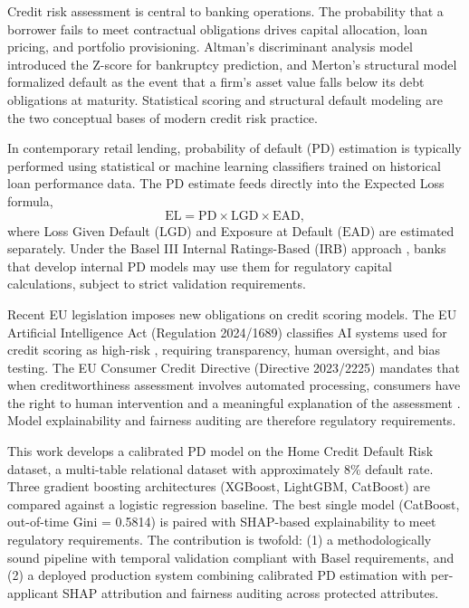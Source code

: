 \documentclass[11pt, a4paper]{article}
\newcommand{\PD}{\text{PD}}
\newcommand{\LGD}{\text{LGD}}
\newcommand{\EAD}{\text{EAD}}
\newcommand{\EL}{\text{EL}}
\begin{document}
Credit risk assessment is central to banking operations. The probability that a borrower fails to meet contractual obligations drives capital allocation, loan pricing, and portfolio provisioning. Altman's \citeyear{altman1968} discriminant analysis model introduced the Z-score for bankruptcy prediction, and Merton's \citeyear{merton1974} structural model formalized default as the event that a firm's asset value falls below its debt obligations at maturity. Statistical scoring and structural default modeling are the two conceptual bases of modern credit risk practice.

In contemporary retail lending, probability of default (PD) estimation is typically performed using statistical or machine learning classifiers trained on historical loan performance data. The PD estimate feeds directly into the Expected Loss formula,
\begin{equation}
\label{eq:expected_loss}
\EL = \PD \times \LGD \times \EAD,
\end{equation}
where Loss Given Default ($\LGD$) and Exposure at Default ($\EAD$) are estimated separately. Under the Basel III Internal Ratings-Based (IRB) approach \parencite{bcbs_basel_framework_2024}, banks that develop internal PD models may use them for regulatory capital calculations, subject to strict validation requirements.

Recent EU legislation imposes new obligations on credit scoring models. The EU Artificial Intelligence Act (Regulation 2024/1689) classifies AI systems used for credit scoring as high-risk \parencite{eu_ai_act_2024_1689}, requiring transparency, human oversight, and bias testing. The EU Consumer Credit Directive (Directive 2023/2225) mandates that when creditworthiness assessment involves automated processing, consumers have the right to human intervention and a meaningful explanation of the assessment \parencite{eu_consumer_credit_directive_2023}. Model explainability and fairness auditing are therefore regulatory requirements.

This work develops a calibrated PD model on the Home Credit Default Risk dataset, a multi-table relational dataset with approximately 8\% default rate. Three gradient boosting architectures (XGBoost, LightGBM, CatBoost) are compared against a logistic regression baseline. The best single model (CatBoost, out-of-time Gini = 0.5814) is paired with SHAP-based explainability \parencite{lundberg2017} to meet regulatory requirements. The contribution is twofold: (1) a methodologically sound pipeline with temporal validation compliant with Basel requirements, and (2) a deployed production system combining calibrated PD estimation with per-applicant SHAP attribution and fairness auditing across protected attributes.
\end{document}
